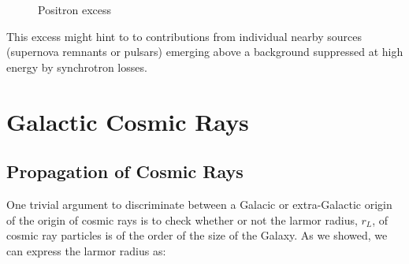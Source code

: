 \documentclass[
  letterpaper,
  DIV=11,
  numbers=noendperiod]{scrreprt}
\begin{document}
\begin{figure}[H]


\caption{\label{fig-positrons}Positron excess}

\end{figure}%

This excess might hint to to contributions from individual nearby
sources (supernova remnants or pulsars) emerging above a background
suppressed at high energy by synchrotron losses.

\section{Galactic Cosmic Rays}\label{galactic-cosmic-rays}

\subsection{Propagation of Cosmic
Rays}\label{propagation-of-cosmic-rays}

One trivial argument to discriminate between a Galacic or extra-Galactic
origin of the origin of cosmic rays is to check whether or not the
larmor radius, \(r_L\), of cosmic ray particles is of the order of the
size of the Galaxy. As we showed, we can express the larmor radius as:
\end{document}
